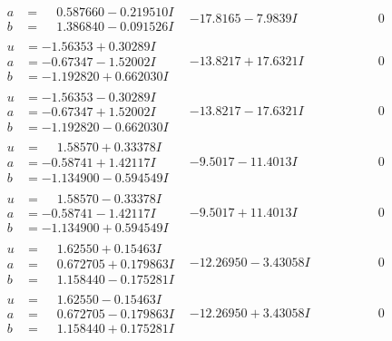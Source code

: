 \documentclass[1p]{elsarticle_modified}
\theoremstyle{definition}
\begin{document}
$$\begin{array}{c|c|c}
\begin{aligned}
a &= \phantom{-}0.587660 - 0.219510 I \\
b &= \phantom{-}1.386840 - 0.091526 I\end{aligned}
 & -17.8165 - 7.9839 I & \phantom{-0.000000 } 0 \\ \hline\begin{aligned}
u &= -1.56353 + 0.30289 I \\
a &= -0.67347 - 1.52002 I \\
b &= -1.192820 + 0.662030 I\end{aligned}
 & -13.8217 + 17.6321 I & \phantom{-0.000000 } 0 \\ \hline\begin{aligned}
u &= -1.56353 - 0.30289 I \\
a &= -0.67347 + 1.52002 I \\
b &= -1.192820 - 0.662030 I\end{aligned}
 & -13.8217 - 17.6321 I & \phantom{-0.000000 } 0 \\ \hline\begin{aligned}
u &= \phantom{-}1.58570 + 0.33378 I \\
a &= -0.58741 + 1.42117 I \\
b &= -1.134900 - 0.594549 I\end{aligned}
 & -9.5017 - 11.4013 I & \phantom{-0.000000 } 0 \\ \hline\begin{aligned}
u &= \phantom{-}1.58570 - 0.33378 I \\
a &= -0.58741 - 1.42117 I \\
b &= -1.134900 + 0.594549 I\end{aligned}
 & -9.5017 + 11.4013 I & \phantom{-0.000000 } 0 \\ \hline\begin{aligned}
u &= \phantom{-}1.62550 + 0.15463 I \\
a &= \phantom{-}0.672705 + 0.179863 I \\
b &= \phantom{-}1.158440 - 0.175281 I\end{aligned}
 & -12.26950 - 3.43058 I & \phantom{-0.000000 } 0 \\ \hline\begin{aligned}
u &= \phantom{-}1.62550 - 0.15463 I \\
a &= \phantom{-}0.672705 - 0.179863 I \\
b &= \phantom{-}1.158440 + 0.175281 I\end{aligned}
 & -12.26950 + 3.43058 I & \phantom{-0.000000 } 0 \\ \hline\begin{aligned}

\end{aligned}
\end{array}$$
\end{document}
